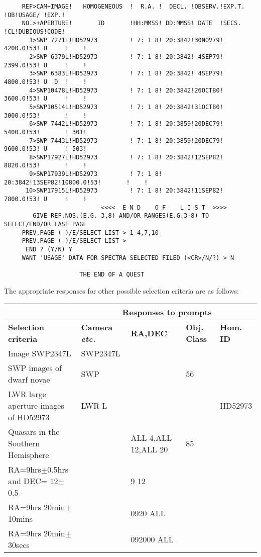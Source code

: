 \begin{footnotesize}
\begin{verbatim}
     REF>CAM+IMAGE!   HOMOGENEOUS  !  R.A. !  DECL. !OBSERV.!EXP.T. !OB!USAGE/ !EXP.!
     NO.>+APERTURE!       ID       !HH:MMSS! DD:MMSS! DATE  !SECS.  !CL!DUBIOUS!CODE!
       1>SWP 7271L!HD52973         ! 7: 1 8! 20:3842!30NOV79! 4200.0!53! U     !    !
       2>SWP 6379L!HD52973         ! 7: 1 8! 20:3842! 4SEP79! 2399.0!53! U     !    !
       3>SWP 6383L!HD52973         ! 7: 1 8! 20:3842! 4SEP79! 4800.0!53! U  D  !    !
       4>SWP10478L!HD52973         ! 7: 1 8! 20:3842!26OCT80! 3600.0!53! U     !    !
       5>SWP10514L!HD52973         ! 7: 1 8! 20:3842!31OCT80! 3000.0!53!       !    !
       6>SWP 7442L!HD52973         ! 7: 1 8! 20:3859!20DEC79! 5400.0!53!       ! 301!
       7>SWP 7443L!HD52973         ! 7: 1 8! 20:3859!20DEC79! 9600.0!53! U     ! 503!
       8>SWP17927L!HD52973         ! 7: 1 8! 20:3842!12SEP82! 8820.0!53!       !    !
       9>SWP17939L!HD52973         ! 7: 1 8! 20:3842!13SEP82!10800.0!53!       !    !
      10>SWP17915L!HD52973         ! 7: 1 8! 20:3842!11SEP82! 7800.0!53! U     !    !
                           <<<<  E N D    O F    L I S T  >>>>
        GIVE REF.NOS.(E.G. 3,8) AND/OR RANGES(E.G.3-8) TO SELECT/END/OR LAST PAGE
     PREV.PAGE (-)/E/SELECT LIST > 1-4,7,10
     PREV.PAGE (-)/E/SELECT LIST >
      END ? (Y/N) Y
     WANT 'USAGE' DATA FOR SPECTRA SELECTED FILED (<CR>/N/?) > N

                     THE END OF A QUEST
\end{verbatim}
\end{footnotesize}
\normalsize
The appropriate responses for other possible selection criteria are as follows:

\footnotesize
\begin{center}
\begin{tabular}{|l|l|l|l|l|} \hline
\footnotesize
{}&\multicolumn{4}{c|}{\bf Responses to prompts} \\ \hline
{\bf Selection criteria}&{\bf Camera {\it etc.}}&{\bf RA,DEC}&{\bf Obj. Class}
&{\bf Hom. ID}\\ \hline
Image SWP2347L &SWP2347L&&&\\
SWP images of dwarf novae &SWP&&56&\\
LWR large aperture images of HD52973&LWR L&&&HD52973\\
Quasars in the Southern Hemisphere&&ALL 4,ALL 12,ALL 20&85&\\
RA=9hrs$\pm$0.5hrs and DEC= 12$\pm$0.5&&9 12 &&\\
RA=9hrs 20min$\pm$10mins &&0920 ALL &&\\
RA=9hrs 20min$\pm$30secs &&092000 ALL &&\\ \hline
\end{tabular}
\end{center}

